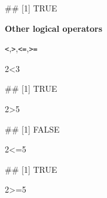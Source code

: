 \documentclass[
]{book}
\newenvironment{Shaded}{\begin{snugshade}}{\end{snugshade}}
\newcommand{\DecValTok}[1]{\textcolor[rgb]{0.00,0.00,0.81}{#1}}
\newcommand{\NormalTok}[1]{#1}
\newcommand{\SpecialCharTok}[1]{\textcolor[rgb]{0.00,0.00,0.00}{#1}}
\begin{document}
\begin{Shaded}
\begin{Highlighting}[]
\NormalTok{\#\# [1] TRUE}
\end{Highlighting}
\end{Shaded}

\textbf{Other logical operators}

\texttt{\textless{}},\texttt{\textgreater{}},\texttt{\textless{}=},\texttt{\textgreater{}=}

\begin{Shaded}
\begin{Highlighting}[]
\DecValTok{2}\SpecialCharTok{\textless{}}\DecValTok{3}
\end{Highlighting}
\end{Shaded}

\begin{Shaded}
\begin{Highlighting}[]
\NormalTok{\#\# [1] TRUE}
\end{Highlighting}
\end{Shaded}

\begin{Shaded}
\begin{Highlighting}[]
\DecValTok{2}\SpecialCharTok{\textgreater{}}\DecValTok{5}
\end{Highlighting}
\end{Shaded}

\begin{Shaded}
\begin{Highlighting}[]
\NormalTok{\#\# [1] FALSE}
\end{Highlighting}
\end{Shaded}

\begin{Shaded}
\begin{Highlighting}[]
\DecValTok{2}\SpecialCharTok{\textless{}=}\DecValTok{5}
\end{Highlighting}
\end{Shaded}

\begin{Shaded}
\begin{Highlighting}[]
\NormalTok{\#\# [1] TRUE}
\end{Highlighting}
\end{Shaded}

\begin{Shaded}
\begin{Highlighting}[]
\DecValTok{2}\SpecialCharTok{\textgreater{}=}\DecValTok{5}
\end{Highlighting}
\end{Shaded}
\end{document}
